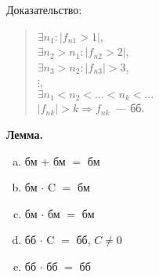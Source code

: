 \documentclass{article}
\begin{document}
	Доказательство:
	\begin{quote}
		$\exists n_1: |f_{n1} > 1|$, \\
		$\exists n_2 > n_1: |f_{n2} > 2|$, \\
		$\exists n_3 > n_2: |f_{n3}| > 3$, \\
		$\vdots$, \\
		$\exists n_1 < n_2 < \dots < n_k < \dots$ \\
		$|f_{nk}| > k \Rightarrow f_{nk}$~--- бб.
	\end{quote}
	\textbf{Лемма.} \\
	\begin{enumerate}[a)]
		\item бм $+$ бм $=$ бм
		\item бм $\cdot$ C $=$ бм
		\item бм $\cdot$ бм $=$ бм
		\item бб $\cdot$ C $=$ бб, $C \not= 0$
		\item бб $\cdot$ бб $=$ бб
	\end{enumerate}
\end{document}
